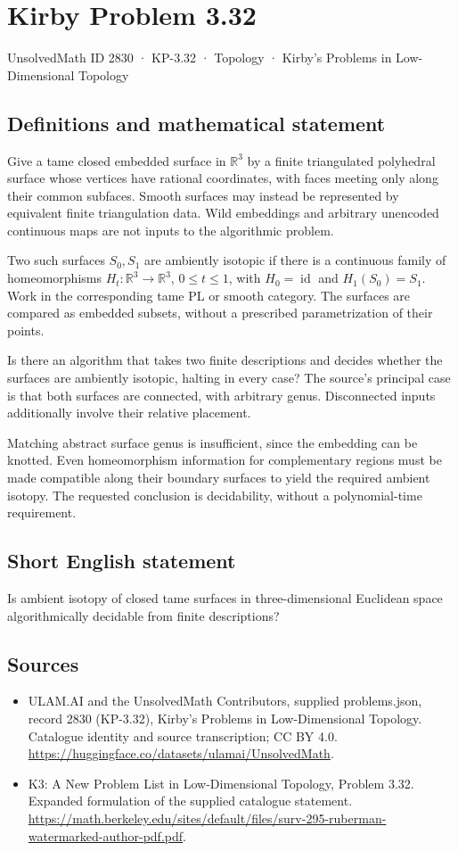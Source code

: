 \documentclass[11pt,a4paper]{article}
\begin{document}
\section*{Kirby Problem 3.32}\label{2830}
{\small UnsolvedMath ID 2830 · KP-3.32 · Topology · Kirby's Problems in Low-Dimensional Topology}
\subsection{Definitions and mathematical statement}
Give a tame closed embedded surface in $\mathbb R^3$ by a finite triangulated
polyhedral surface whose vertices have rational coordinates, with faces
meeting only along their common subfaces. Smooth surfaces may instead be
represented by equivalent finite triangulation data. Wild embeddings and
arbitrary unencoded continuous maps are not inputs to the algorithmic problem.

Two such surfaces $S_0,S_1$ are ambiently isotopic if there is a continuous
family of homeomorphisms $H_t:\mathbb R^3\to\mathbb R^3$, $0\leq t\leq1$,
with $H_0=\operatorname{id}$ and $H_1(S_0)=S_1$. Work in the corresponding
tame PL or smooth category. The surfaces are compared as embedded subsets,
without a prescribed parametrization of their points.

Is there an algorithm that takes two finite descriptions and decides whether
the surfaces are ambiently isotopic, halting in every case? The source's
principal case is that both surfaces are connected, with arbitrary genus.
Disconnected inputs additionally involve their relative placement.

Matching abstract surface genus is insufficient, since the embedding can
be knotted. Even homeomorphism information for complementary regions must
be made compatible along their boundary surfaces to yield the required
ambient isotopy. The requested conclusion is decidability, without a
polynomial-time requirement.
\subsection{Short English statement}
Is ambient isotopy of closed tame surfaces in three-dimensional Euclidean space algorithmically decidable from finite descriptions?
\subsection{Sources}
\begin{itemize}
\item[S1] ULAM.AI and the UnsolvedMath Contributors, supplied problems.json, record 2830 (KP-3.32), Kirby's Problems in Low-Dimensional Topology. Catalogue identity and source transcription; CC BY 4.0.
\url{https://huggingface.co/datasets/ulamai/UnsolvedMath}.
\item[S2] K3: A New Problem List in Low-Dimensional Topology, Problem 3.32. Expanded formulation of the supplied catalogue statement.
\url{https://math.berkeley.edu/sites/default/files/surv-295-ruberman-watermarked-author-pdf.pdf}.
\end{itemize}
\end{document}
